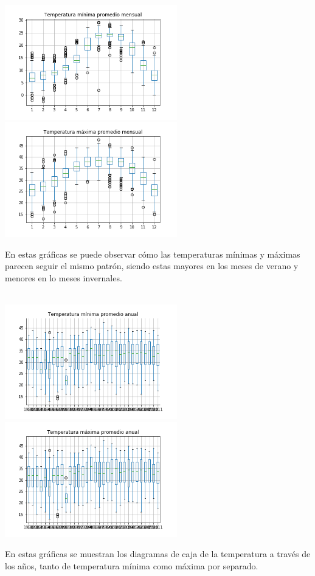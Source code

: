 \documentclass[letterpaper,12pt]{article}
\begin{document}
\\
\begin{center}
	\includegraphics[height=5cm]{cajamin_mensual2.png} \hspace*{\fill}
    \includegraphics[height=5cm]{cajamax_mensual2.png}
\end{center}
En estas gráficas se puede observar cómo las temperaturas mínimas y máximas parecen seguir el mismo patrón, siendo estas mayores en los meses de verano y menores en lo meses invernales.
\\ 
\\
\begin{center}
	\includegraphics[height=5cm]{cajamin_anual2.png} \hspace*{\fill}
    \includegraphics[height=5cm]{cajamax_anual2.png}
\end{center}
En estas gráficas se muestran los diagramas de caja de la temperatura a través de los años, tanto de temperatura mínima como máxima por separado. 
\end{document}
